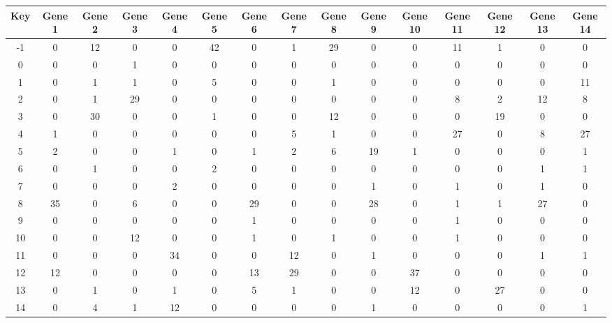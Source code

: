 \begin{tabular}{|c|c|c|c|c|c|c|c|c|c|c|c|c|c|c|}
\hline
Key & Gene 1 & Gene 2 & Gene 3 & Gene 4 & Gene 5 & Gene 6 & Gene 7 & Gene 8 & Gene 9 & Gene 10 & Gene 11 & Gene 12 & Gene 13 & Gene 14 \\
\hline
-1 & 0 & 12 & 0 & 0 & 42 & 0 & 1 & 29 & 0 & 0 & 11 & 1 & 0 & 0 \\
0 & 0 & 0 & 1 & 0 & 0 & 0 & 0 & 0 & 0 & 0 & 0 & 0 & 0 & 0 \\
1 & 0 & 1 & 1 & 0 & 5 & 0 & 0 & 1 & 0 & 0 & 0 & 0 & 0 & 11 \\
2 & 0 & 1 & 29 & 0 & 0 & 0 & 0 & 0 & 0 & 0 & 8 & 2 & 12 & 8 \\
3 & 0 & 30 & 0 & 0 & 1 & 0 & 0 & 12 & 0 & 0 & 0 & 19 & 0 & 0 \\
4 & 1 & 0 & 0 & 0 & 0 & 0 & 5 & 1 & 0 & 0 & 27 & 0 & 8 & 27 \\
5 & 2 & 0 & 0 & 1 & 0 & 1 & 2 & 6 & 19 & 1 & 0 & 0 & 0 & 1 \\
6 & 0 & 1 & 0 & 0 & 2 & 0 & 0 & 0 & 0 & 0 & 0 & 0 & 1 & 1 \\
7 & 0 & 0 & 0 & 2 & 0 & 0 & 0 & 0 & 1 & 0 & 1 & 0 & 1 & 0 \\
8 & 35 & 0 & 6 & 0 & 0 & 29 & 0 & 0 & 28 & 0 & 1 & 1 & 27 & 0 \\
9 & 0 & 0 & 0 & 0 & 0 & 1 & 0 & 0 & 0 & 0 & 1 & 0 & 0 & 0 \\
10 & 0 & 0 & 12 & 0 & 0 & 1 & 0 & 1 & 0 & 0 & 1 & 0 & 0 & 0 \\
11 & 0 & 0 & 0 & 34 & 0 & 0 & 12 & 0 & 1 & 0 & 0 & 0 & 1 & 1 \\
12 & 12 & 0 & 0 & 0 & 0 & 13 & 29 & 0 & 0 & 37 & 0 & 0 & 0 & 0 \\
13 & 0 & 1 & 0 & 1 & 0 & 5 & 1 & 0 & 0 & 12 & 0 & 27 & 0 & 0 \\
14 & 0 & 4 & 1 & 12 & 0 & 0 & 0 & 0 & 1 & 0 & 0 & 0 & 0 & 1 \\
\hline
\end{tabular}